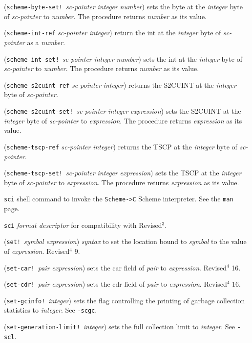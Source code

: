 \documentclass[10pt,twocolumn]{article}
\begin{document}
(\texttt{scheme-byte-set!}\ \emph{sc-pointer} \emph{integer} \emph{number}) sets the
byte at the \emph{integer} byte of \emph{sc-pointer} to \emph{number}.  The
procedure returns \emph{number} as its value.

(\texttt{scheme-int-ref} \emph{sc-pointer} \emph{integer}) return the int at the
\emph{integer} byte of \emph{sc-pointer} as a \emph{number}.

(\texttt{scheme-int-set!}\ \emph{sc-pointer} \emph{integer} \emph{number}) sets the
int at the \emph{integer} byte of \emph{sc-pointer} to \emph{number}.  The
procedure returns \emph{number} as its value.

(\texttt{scheme-s2cuint-ref} \emph{sc-pointer} \emph{integer}) returns the S2CUINT at
the \emph{integer} byte of \emph{sc-pointer}.

(\texttt{scheme-s2cuint-set!}\ \emph{sc-pointer} \emph{integer} \emph{expression}) sets
the S2CUINT at the \emph{integer} byte of \emph{sc-pointer} to \emph{expression}.
The procedure returns \emph{expression} as its value.

(\texttt{scheme-tscp-ref} \emph{sc-pointer} \emph{integer}) returns the TSCP at
the \emph{integer} byte of \emph{sc-pointer}.

(\texttt{scheme-tscp-set!}\ \emph{sc-pointer} \emph{integer} \emph{expression}) sets
the TSCP at the \emph{integer} byte of \emph{sc-pointer} to \emph{expression}.
The procedure returns \emph{expression} as its value.

\texttt{sci} shell command to invoke the \texttt{Scheme->C} Scheme interpreter.  See the
\texttt{man} page.

\texttt{sci} \emph{format descriptor} for compatibility with Revised$^3$.

(\texttt{set!}\ \emph{symbol} \emph{expression}) \emph{syntax} to set the location
bound to \emph{symbol} to the value of \emph{expression}.  Revised$^4$ 9.

(\texttt{set-car!}\ \emph{pair} \emph{expression}) sets the car field of
\emph{pair} to \emph{expression}.  Revised$^4$ 16.

(\texttt{set-cdr!}\ \emph{pair} \emph{expression}) sets the cdr field of
\emph{pair} to \emph{expression}.  Revised$^4$ 16.

(\texttt{set-gcinfo!}\ \emph{integer}) sets the flag controlling the printing of
garbage collection statistics to \emph{integer}.  See \texttt{-scgc}.

(\texttt{set-generation-limit!}\ \emph{integer}) sets the full collection
limit to \emph{integer}.  See \texttt{-scl}.
\end{document}
